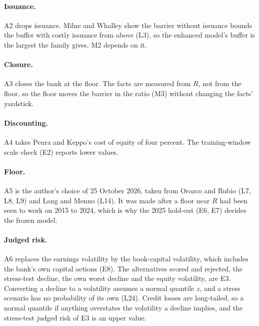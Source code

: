 \paragraph{Issuance.} A2 drops issuance. Milne and Whalley show the barrier
without issuance bounds the buffer with costly issuance from above (L3), so
the enhanced model's buffer is the largest the family gives. M2 depends on it.

\paragraph{Closure.} A3 closes the bank at the floor. The facts are measured
from $R$, not from the floor, so the floor moves the barrier in the ratio
(M3) without changing the facts' yardstick.

\paragraph{Discounting.} A4 takes Peura and Keppo's cost of equity of four
percent. The training-window scale check (E2) reports lower values.

\paragraph{Floor.} A5 is the author's choice of 25 October 2026, taken from
Orozco and Rubio (L7, L8, L9) and Lang and Menno (L14). It was made after a
floor near $R$ had been seen to work on 2015 to 2024, which is why the 2025
hold-out (E6, E7) decides the frozen model.

\paragraph{Judged risk.} A6 replaces the earnings volatility by the
book-capital volatility, which includes the bank's own capital actions (E8).
The alternatives scored and rejected, the stress-test decline, the own worst
decline and the equity volatility, are E3. Converting a decline to a volatility
assumes a normal quantile $z$, and a stress scenario has no probability of
its own (L24). Credit losses are long-tailed, so a normal quantile if anything
overstates the volatility a decline implies, and the stress-test judged risk
of E3 is an upper value.


